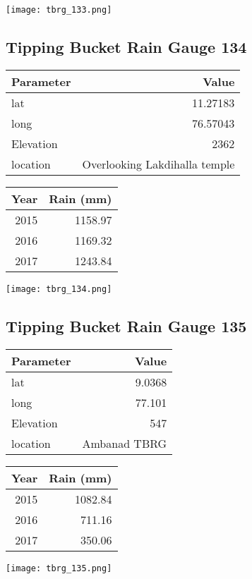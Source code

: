 \documentclass[a4paper]{article}
\begin{document}
\begin{center}
\texttt{[image: tbrg\_133.png]}
\end{center}

\newpage

\subsection*{Tipping Bucket Rain Gauge 134}
\label{sec:orgbf00dc6}

\begin{center}
\begin{tabular}{lr}
Parameter & Value\\
\hline
lat & 11.27183\\
long & 76.57043\\
Elevation & 2362\\
location & Overlooking Lakdihalla temple\\
\end{tabular}
\end{center}

\begin{center}
\begin{tabular}{rr}
Year & Rain (mm)\\
\hline
2015 & 1158.97\\
2016 & 1169.32\\
2017 & 1243.84\\
\end{tabular}
\end{center}

\begin{center}
\texttt{[image: tbrg\_134.png]}
\end{center}

\newpage

\subsection*{Tipping Bucket Rain Gauge 135}
\label{sec:org3c3b16d}

\begin{center}
\begin{tabular}{lr}
Parameter & Value\\
\hline
lat & 9.0368\\
long & 77.101\\
Elevation & 547\\
location & Ambanad TBRG\\
\end{tabular}
\end{center}

\begin{center}
\begin{tabular}{rr}
Year & Rain (mm)\\
\hline
2015 & 1082.84\\
2016 & 711.16\\
2017 & 350.06\\
\end{tabular}
\end{center}

\begin{center}
\texttt{[image: tbrg\_135.png]}
\end{center}
\end{document}
